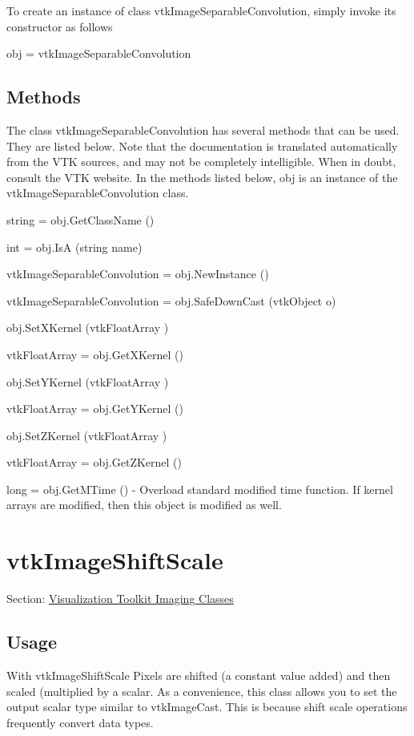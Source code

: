 To create an instance of class vtk\-Image\-Separable\-Convolution, simply invoke its constructor as follows \begin{DoxyVerb}  obj = vtkImageSeparableConvolution
\end{DoxyVerb}
 \hypertarget{vtkwidgets_vtkxyplotwidget_Methods}{}\subsection{Methods}\label{vtkwidgets_vtkxyplotwidget_Methods}
The class vtk\-Image\-Separable\-Convolution has several methods that can be used. They are listed below. Note that the documentation is translated automatically from the V\-T\-K sources, and may not be completely intelligible. When in doubt, consult the V\-T\-K website. In the methods listed below, {\ttfamily obj} is an instance of the vtk\-Image\-Separable\-Convolution class. 
\begin{DoxyItemize}
\item {\ttfamily string = obj.\-Get\-Class\-Name ()}  
\item {\ttfamily int = obj.\-Is\-A (string name)}  
\item {\ttfamily vtk\-Image\-Separable\-Convolution = obj.\-New\-Instance ()}  
\item {\ttfamily vtk\-Image\-Separable\-Convolution = obj.\-Safe\-Down\-Cast (vtk\-Object o)}  
\item {\ttfamily obj.\-Set\-X\-Kernel (vtk\-Float\-Array )}  
\item {\ttfamily vtk\-Float\-Array = obj.\-Get\-X\-Kernel ()}  
\item {\ttfamily obj.\-Set\-Y\-Kernel (vtk\-Float\-Array )}  
\item {\ttfamily vtk\-Float\-Array = obj.\-Get\-Y\-Kernel ()}  
\item {\ttfamily obj.\-Set\-Z\-Kernel (vtk\-Float\-Array )}  
\item {\ttfamily vtk\-Float\-Array = obj.\-Get\-Z\-Kernel ()}  
\item {\ttfamily long = obj.\-Get\-M\-Time ()} -\/ Overload standard modified time function. If kernel arrays are modified, then this object is modified as well.  
\end{DoxyItemize}\hypertarget{vtkimaging_vtkimageshiftscale}{}\section{vtk\-Image\-Shift\-Scale}\label{vtkimaging_vtkimageshiftscale}
Section\-: \hyperlink{sec_vtkimaging}{Visualization Toolkit Imaging Classes} \hypertarget{vtkwidgets_vtkxyplotwidget_Usage}{}\subsection{Usage}\label{vtkwidgets_vtkxyplotwidget_Usage}
With vtk\-Image\-Shift\-Scale Pixels are shifted (a constant value added) and then scaled (multiplied by a scalar. As a convenience, this class allows you to set the output scalar type similar to vtk\-Image\-Cast. This is because shift scale operations frequently convert data types.

